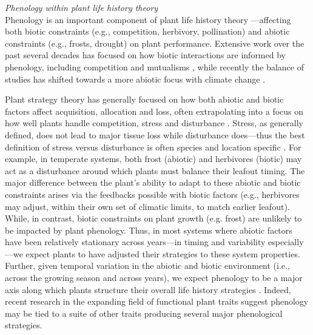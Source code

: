 \documentclass[11pt,a4paper,oneside]{article}
\begin{document}
\noindent \emph{Phenology within plant life history theory}\\
\noindent Phenology is an important component of plant life history theory \citep{Almufti1977,Grime:1977sw,stanton2000}---affecting both biotic constraints (e.g., competition, herbivory, pollination) and abiotic constraints (e.g., frosts, drought) on plant performance. Extensive work over the past several decades has focused on how biotic interactions are informed by phenology, including competition \citep[e.g.,][]{Rathcke:1988yc,VANSCHAIK:1993uq} and mutualisms \citep[e.g.,][]{Brody:1997ro}, while recently the balance of studies has shifted towards a more abiotic focus with climate change \citep[e.g.,][]{Inouye:2008gj,Miller-Rushing:2008zv}.

Plant strategy theory has generally focused on how both abiotic and biotic factors affect acquisition, allocation and loss, often extrapolating into a focus on how well plants handle competition, stress and disturbance \citep{Grime:1977sw,crainebook}. Stress, as generally defined, does not lead to major tissue loss while disturbance does---thus the best definition of stress versus disturbance is often species and location specific \citep{crainebook}. For example, in temperate systems, both frost (abiotic) and herbivores (biotic) may act as a disturbance around which plants must balance their leafout timing. The major difference between the plant's ability to adapt to these abiotic and biotic constraints arises via the feedbacks possible with biotic factors (e.g., herbivores may adjust, within their own set of climatic limits, to match earlier leafout). While, in contrast, biotic constraints on plant growth (e.g. frost) are unlikely to be impacted by plant phenology.  Thus, in most systems where abiotic factors have been relatively stationary across years---in timing and variability especially---we expect plants to have adjusted their strategies to these system properties. Further, given temporal variation in the abiotic and biotic environment (i.e., across the growing season and across years), we expect phenology to be a major axis along which plants structure their overall life history strategies \citep{Grime:1977sw}. Indeed, recent research in the expanding field of functional plant traits suggest phenology may be tied to a suite of other traits producing several major phenological strategies.\\
\end{document}
